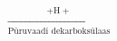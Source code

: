 \documentclass[preview]{standalone}
\begin{document}
\begin{align*}
\xrightarrow[\text{Püruvaadi dekarboksülaas}]{+\text{H}+}
\end{align*}
\end{document}
